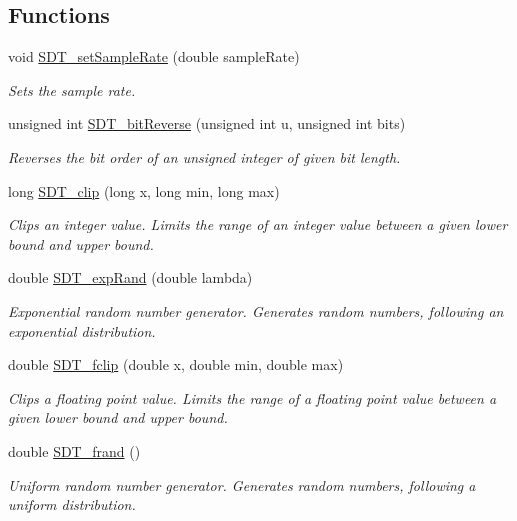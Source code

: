 \subsection*{Functions}
\begin{DoxyCompactItemize}
\item 
void \hyperlink{group__common_gad76f7b9f128e79164c76764be6e03be8}{S\+D\+T\+\_\+set\+Sample\+Rate} (double sample\+Rate)
\begin{DoxyCompactList}\small\item\em Sets the sample rate. \end{DoxyCompactList}\item 
unsigned int \hyperlink{group__common_ga6af63ffbd60bf3dc77541e65a142a45d}{S\+D\+T\+\_\+bit\+Reverse} (unsigned int u, unsigned int bits)
\begin{DoxyCompactList}\small\item\em Reverses the bit order of an unsigned integer of given bit length. \end{DoxyCompactList}\item 
long \hyperlink{group__common_ga0342f8b56e6cbbabfef9af29969832e7}{S\+D\+T\+\_\+clip} (long x, long min, long max)
\begin{DoxyCompactList}\small\item\em Clips an integer value. Limits the range of an integer value between a given lower bound and upper bound. \end{DoxyCompactList}\item 
double \hyperlink{group__common_ga83bce696979570186fa2b44fa56127d2}{S\+D\+T\+\_\+exp\+Rand} (double lambda)
\begin{DoxyCompactList}\small\item\em Exponential random number generator. Generates random numbers, following an exponential distribution. \end{DoxyCompactList}\item 
double \hyperlink{group__common_ga68a73e5fdefd2380d2fc7b9ec652e5ea}{S\+D\+T\+\_\+fclip} (double x, double min, double max)
\begin{DoxyCompactList}\small\item\em Clips a floating point value. Limits the range of a floating point value between a given lower bound and upper bound. \end{DoxyCompactList}\item 
double \hyperlink{group__common_ga013b682e93f89b614ff647e379a83ee6}{S\+D\+T\+\_\+frand} ()
\begin{DoxyCompactList}\small\item\em Uniform random number generator. Generates random numbers, following a uniform distribution. \end{DoxyCompactList}\item 

\end{DoxyCompactItemize}
